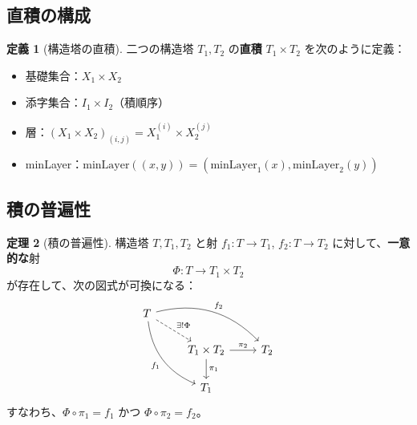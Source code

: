 \documentclass[a4paper,12pt]{ltjsarticle}
\theoremstyle{definition}
\newtheorem{theorem}{定理}[section]
\newtheorem{definition}[theorem]{定義}
\begin{document}
\subsection{直積の構成}

\begin{definition}[構造塔の直積]\label{def:product}
二つの構造塔 $T_1, T_2$ の\textbf{直積} $T_1 \times T_2$ を次のように定義：
\begin{itemize}
\item 基礎集合：$X_1 \times X_2$
\item 添字集合：$I_1 \times I_2$（積順序）
\item 層：$(X_1 \times X_2)_{(i,j)} = X_1^{(i)} \times X_2^{(j)}$
\item minLayer：$\mathrm{minLayer}((x, y)) = (\mathrm{minLayer}_1(x), \mathrm{minLayer}_2(y))$
\end{itemize}
\end{definition}

\begin{center}
\end{center}

\subsection{積の普遍性}

\begin{theorem}[積の普遍性]\label{thm:product_universal}
構造塔 $T, T_1, T_2$ と射 $f_1 : T \to T_1$, $f_2 : T \to T_2$ に対して、\textbf{一意的な}射
\[
\Phi : T \to T_1 \times T_2
\]
が存在して、次の図式が可換になる：
\[
\begin{tikzcd}
T \arrow[dr, "\exists! \Phi", dashed] \arrow[ddr, "f_1"', bend right] \arrow[drr, "f_2", bend left] & & \\
& T_1 \times T_2 \arrow[d, "\pi_1"] \arrow[r, "\pi_2"] & T_2 \\
& T_1 &
\end{tikzcd}
\]
すなわち、$\Phi \circ \pi_1 = f_1$ かつ $\Phi \circ \pi_2 = f_2$。
\end{theorem}
\end{document}

